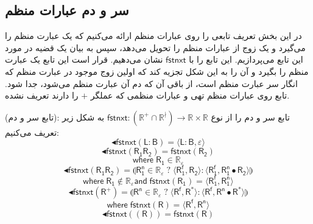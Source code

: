 \subsection{سر و دم عبارات منظم}
در این بخش تعریف تابعی را روی عبارات منظم ارائه می‌کنیم که یک عبارت منظم را می‌گیرد و یک زوج از عبارات منظم را تحویل می‌دهد، سپس به بیان یک قضیه در مورد این تابع می‌پردازیم. این تابع را با
$\mathsf{fstnxt}$
نشان می‌دهیم. قرار است این تابع یک عبارت منظم را بگیرد و آن را به این شکل تجزیه کند که اولین زوج موجود در عبارت منظم که انگار سر عبارت منظم است، از باقی آن که دم آن عبارت منظم می‌شود، جدا شود. تابع روی عبارات منظم تهی و عبارات منظمی که عملگر $+$ را دارند تعریف نشده.
\begin{defn}
	(تابع سر و دم): تابع سر و دم را از نوع 
	$\mathsf{fstnxt}:\mathbb{( \mathbb{R^+ \cap R^\nmid})} \rightarrow \mathbb{R \times R}$ 
	به شکل زیر تعریف می‌‌کنیم:
	$$
	\blacktriangleleft\mathsf{fstnxt (L:B) = \langle L:B , \varepsilon \rangle }
	$$
	$$
	\blacktriangleleft\mathsf{fstnxt (R_1 R_2) = fstnxt (R_2)}$$
	$$\mathsf{where\; R_1 \in \mathbb{R}_\varepsilon}$$
	$$\blacktriangleleft\mathsf{fstnxt(R_1 R_2)= \llparenthesis  R_1^n \in \mathbb{R}_\varepsilon \; \mathbb{?} \; \langle R_1^f , R_2 \rangle : 
		\langle R_1^f , R_1^n \bullet R_{2} \rangle \rrparenthesis} $$
	$$\mathsf{where\; R_1 \notin \mathbb{R}_\varepsilon and\;
		fstnxt(R_1)= \langle R_1^f , R_1^n \rangle}$$
	$$\blacktriangleleft\mathsf{fstnxt(R^+)= \llparenthesis R^n \in \mathbb{R_\varepsilon}\;?\;\langle R^f , R^* \rangle : \langle R^f , R^n \bullet R^* \rangle \rrparenthesis}$$
	$$\mathsf{where\; fstnxt(R)=\langle R^f , R^n \rangle}$$
	$$\blacktriangleleft\mathsf{fstnxt((R))=fstnxt(R)}$$
	
\end{defn}

